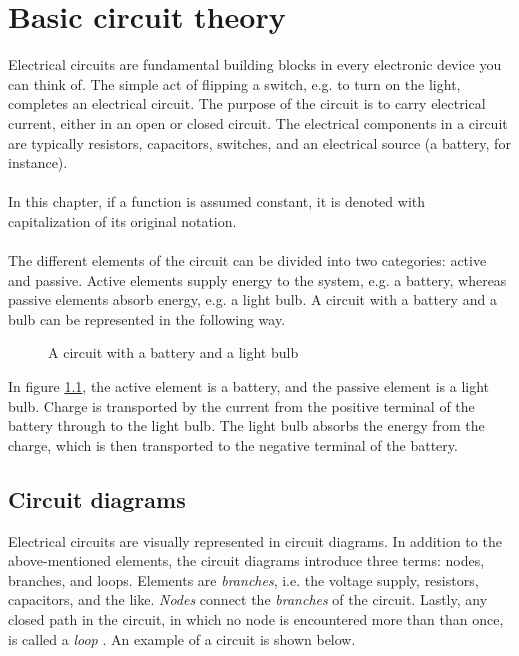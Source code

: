 \chapter{Basic circuit theory}
Electrical circuits are fundamental building blocks in every electronic device you can think of. The simple act of flipping a switch, e.g. to turn on the light, completes an electrical circuit. The purpose of the circuit is to carry electrical current, either in an open or closed circuit. The electrical components in a circuit are typically resistors, capacitors,  switches, and an electrical 	source (a battery, for instance).
\\ 
\\
In this chapter, if a function is assumed constant, it is denoted with capitalization of its original notation. 
\\ 
\\
The different elements of the circuit can be divided into two categories: active and passive. Active elements supply energy to the system, e.g. a battery, whereas passive elements absorb energy, e.g. a light bulb. A circuit with a battery and a bulb can be represented in the following way.
\begin{figure}[H]

\caption{A circuit with a battery and a light bulb}
\label{fig:bulb}
\end{figure} 
\noindent In figure \ref{fig:bulb}, the active element is a battery, and the passive element is a light bulb. Charge is transported by the current from the positive terminal of the battery through to the light bulb. The light bulb absorbs the energy from the charge, which is then transported to the negative terminal of the battery.
\\



\section{Circuit diagrams}
Electrical circuits are visually represented in circuit diagrams. In addition to the above-mentioned elements, the circuit diagrams introduce three terms: nodes, branches, and loops. Elements are \textit{branches}, i.e.  the voltage supply, resistors, capacitors, and the like. \textit{Nodes} connect the \textit{branches} of the circuit. Lastly, any closed path in the circuit, in which no node is encountered more than than once, is called a \textit{loop} \cite[page~32]{bcircuit}. An example of a circuit is shown below.

